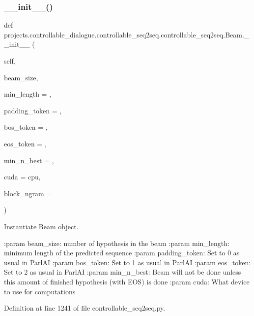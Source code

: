 \subsubsection{\texorpdfstring{\+\_\+\+\_\+init\+\_\+\+\_\+()}{\_\_init\_\_()}}
{\footnotesize\ttfamily def projects.\+controllable\+\_\+dialogue.\+controllable\+\_\+seq2seq.\+controllable\+\_\+seq2seq.\+Beam.\+\_\+\+\_\+init\+\_\+\+\_\+ (\begin{DoxyParamCaption}\item[{}]{self,  }\item[{}]{beam\+\_\+size,  }\item[{}]{min\+\_\+length = {},  }\item[{}]{padding\+\_\+token = {},  }\item[{}]{bos\+\_\+token = {},  }\item[{}]{eos\+\_\+token = {},  }\item[{}]{min\+\_\+n\+\_\+best = {},  }\item[{}]{cuda = {\ttfamily \textquotesingle{}cpu\textquotesingle{}},  }\item[{}]{block\+\_\+ngram = {} }\end{DoxyParamCaption})}

\begin{DoxyVerb}Instantiate Beam object.

:param beam_size:
    number of hypothesis in the beam
:param min_length:
    minimum length of the predicted sequence
:param padding_token:
    Set to 0 as usual in ParlAI
:param bos_token:
    Set to 1 as usual in ParlAI
:param eos_token:
    Set to 2 as usual in ParlAI
:param min_n_best:
    Beam will not be done unless this amount of finished hypothesis
    (with EOS) is done
:param cuda:
    What device to use for computations
\end{DoxyVerb}
 

Definition at line 1241 of file controllable\+\_\+seq2seq.\+py.


